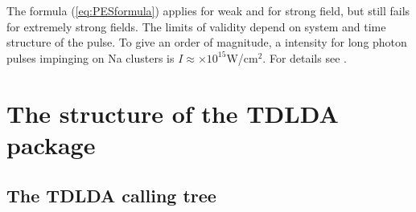 \documentclass[final,1p]{elsarticle}
\begin{document}
The formula (\ref{eq:PESformula}) applies for weak and for strong
field, but still fails for extremely strong fields. The limits of
validity depend on system and time structure of the pulse.  To give an
order of magnitude, a intensity for long photon pulses impinging on Na
clusters is $I\approx\times{10}^{15}$W/cm$^2$. For details see
\cite{Din13a}.


\section{The structure of the TDLDA package}
\label{sec:TDLDAnum}


\subsection{The TDLDA calling tree}
\label{sec:TDLDAtree}
\end{document}
